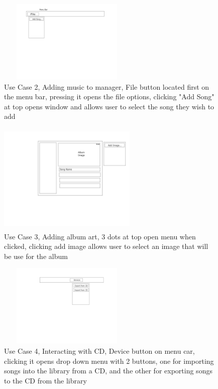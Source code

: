 \documentclass[10pt,conference,onecolumn,compsoc]{IEEEtran}
\begin{document}
\begin{figure}[ht!]
\includegraphics[height=150px, width=250px]{Add_Music_Mock_Up.jpg}
\caption{Use Case 2, Adding music to manager, File button located first on the menu bar, pressing it opens the file options, clicking "Add Song" at top opens window and allows user to select the song they wish to add}
\label{AddMusic}
\end{figure}

\begin{figure}
\includegraphics[height=200px, width=250px]{Add_Image_Mock_Up.jpg}
\caption{Use Case 3, Adding album art, 3 dots at top open menu when clicked, clicking add image allows user to select an image that will be use for the album}
\label{AddAlbumArt}
\end{figure}

\begin{figure}
\includegraphics[height=150px, width=250px]{Play_CD_Mock_Up.jpg}
\caption{Use Case 4, Interacting with CD, Device button on menu car, clicking it opens drop down menu with 2 buttons, one for importing songs into the library from a CD, and the other for exporting songs to the CD from the library}
\label{PlayCD}
\end{figure}
\end{document}
